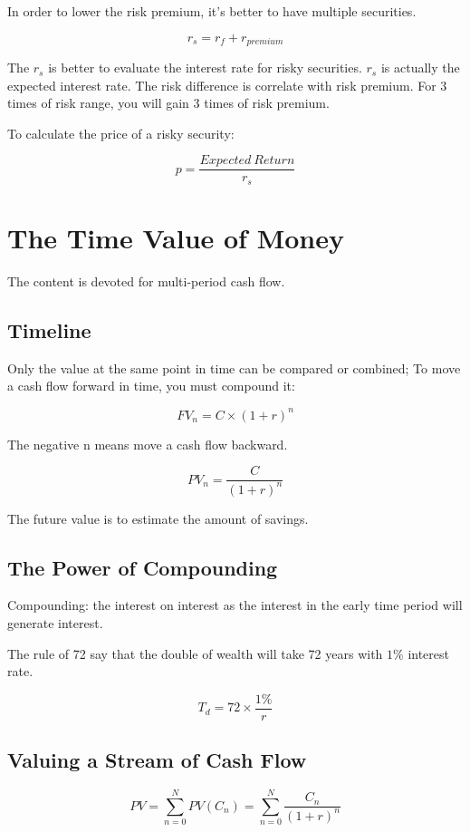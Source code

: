\documentclass[10pt, a4paper]{article}
\begin{document}
                In order to lower the risk premium, it's better to have multiple securities. 

                $$r_s = r_f + r_{premium}$$

                The $r_s$ is better to evaluate the interest rate for risky securities. $r_s$ is actually the expected interest rate.  The risk difference is correlate with risk premium. For 3 times of risk range, you will gain 3 times of risk premium.

                To calculate the price of a risky security: 

                $$p = \frac{Expected\ Return}{r_s}$$
    \section{The Time Value of Money}
        The content is devoted for multi-period cash flow. 

        \subsection{Timeline}
            Only the value at the same point in time can be compared or combined; To move a cash flow forward in time, you must compound it: 

            $$FV_n = C \times (1 + r) ^ n$$

            The negative n means move a cash flow backward. 

            $$PV_n = \frac{C}{(1 + r)^n}$$

            The future value is to estimate the amount of savings. 
        \subsection{The Power of Compounding}
            Compounding: the interest on interest as the interest in the early time period will generate interest. 

            The rule of 72 say that the double of wealth will take 72 years with $1\%$ interest rate. 

            $$T_d = 72 \times \frac{1\%}{r}$$

        \subsection{Valuing a Stream of Cash Flow}
        
        $$PV = \sum_{n = 0}^{N}PV(C_n) = \sum_{n = 0}^{N}\frac{C_n}{(1 + r)^n}$$
\end{document}

